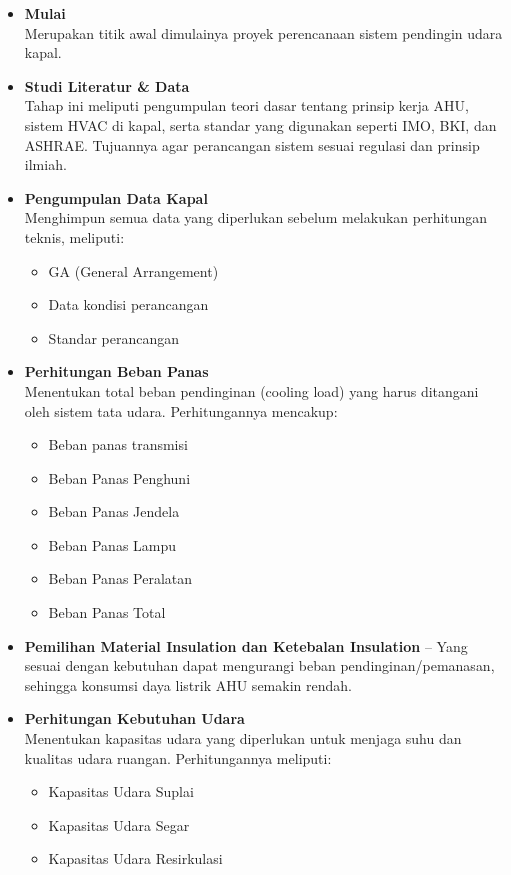 \documentclass[12pt,a4paper,twoside,openright]{book}
\theoremstyle{definition}
\theoremstyle{plain}
\theoremstyle{remark}
\begin{document}
\begin{itemize}
  \item \textbf{Mulai} \\
  Merupakan titik awal dimulainya proyek perencanaan sistem pendingin udara kapal.

  \item \textbf{Studi Literatur \& Data} \\
  Tahap ini meliputi pengumpulan teori dasar tentang prinsip kerja AHU, sistem HVAC di kapal, serta standar yang digunakan seperti IMO, BKI, dan ASHRAE. Tujuannya agar perancangan sistem sesuai regulasi dan prinsip ilmiah.

  \item \textbf{Pengumpulan Data Kapal} \\
  Menghimpun semua data yang diperlukan sebelum melakukan perhitungan teknis, meliputi:
  \begin{itemize}
    \item GA (General Arrangement)
    \item Data kondisi perancangan
    \item Standar perancangan
  \end{itemize}

  \item \textbf{Perhitungan Beban Panas} \\
  Menentukan total beban pendinginan (cooling load) yang harus ditangani oleh sistem tata udara. Perhitungannya mencakup:
  \begin{itemize}
    \item Beban panas transmisi
    \item Beban Panas Penghuni
    \item Beban Panas Jendela
    \item Beban Panas Lampu
    \item Beban Panas Peralatan
    \item Beban Panas Total
  \end{itemize}

  \item \textbf{Pemilihan Material Insulation dan Ketebalan Insulation} --
  Yang sesuai dengan kebutuhan dapat mengurangi beban pendinginan/pemanasan, sehingga konsumsi daya listrik AHU semakin rendah.

  \item \textbf{Perhitungan Kebutuhan Udara} \\
  Menentukan kapasitas udara yang diperlukan untuk menjaga suhu dan kualitas udara ruangan. Perhitungannya meliputi:
  \begin{itemize}
    \item Kapasitas Udara Suplai
    \item Kapasitas Udara Segar
    \item Kapasitas Udara Resirkulasi
  \end{itemize}


\end{itemize}
\end{document}
